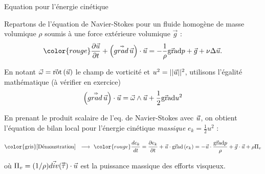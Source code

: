 \begin{frame}{Equation pour l'énergie cinétique}

\small

Repartons de l'équation de Navier-Stokes pour un fluide homogène de masse volumique $\rho$ soumis à une force extérieure volumique $\vec g$ : 
\begin{equation}
	\color{rouge}
  \dpdt{\myvec{u}} + \left( \mytensor{grad} \, \myvec{u} \right) \cdot \myvec{u}
  =
  -\frac{1}{\rho} \gradient p + \vec{g}  + \nu \Delta  \myvec{u}.
\end{equation}

\medskip \pause

En notant $\vec{\omega} = \vec{\mbox{\rm ro}}\mbox{\rm t}\,(\vec{u})$ le champ de vorticité et 
$u^2 = ||\vec{u}||^2$, utilisons l'égalité mathématique (à vérifier en exercice)
\begin{equation*}
 \left( \accentset{\Rightarrow}{grad} \, \vec{u} \right) \cdot \vec{u}
  =
  \vec{\omega} \wedge \vec{u} + \frac{1}{2} \vec{\mbox{\rm gra}}\mbox{\rm d}{u^2}
\end{equation*}

\medskip \pause

En prenant le produit scalaire de l'eq. de Navier-Stokes avec $ \vec{u}$, on obtient
l'équation de bilan local pour l'énergie cinétique {\em massique}
$\displaystyle e_k = \frac{1}{2} u^2$ :

\bigskip

\begin{equation}
  \mbox{\color{gris} [Démonstration] \; $\longrightarrow$ \;}
	\color{rouge}
  \ddt{e_k} = \dpdt{e_k} + \myvec{u}\cdot \gradient \left (e_k\right)
  = 
  - \myvec{u} 
  \cdot \frac{\gradient p}{\rho}  + \vec{g} \cdot \vec{u} + \rho \Pi_v 
\end{equation}

où $\Pi_v = (1/\rho) \vec{div}({\accentset{\Rightarrow}{\tau}}) \cdot \vec{u}$ est la puissance massique des efforts visqueux.

\medskip

\pause


\end{frame}
